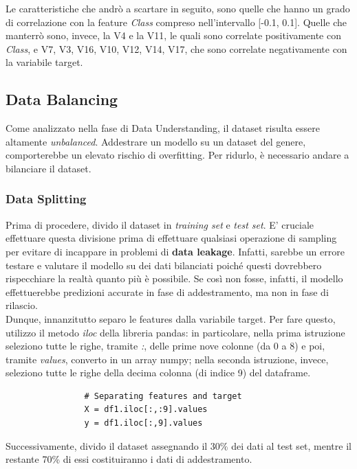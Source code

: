 \documentclass[]{article}
\begin{document}
            Le caratteristiche che andrò a scartare in seguito, sono quelle che hanno un grado di correlazione con la feature \textit{Class} compreso nell'intervallo [-0.1, 0.1]. Quelle che manterrò sono, invece, la V4 e la V11, le quali sono correlate positivamente con \textit{Class}, e V7, V3, V16, V10, V12, V14, V17, che sono correlate negativamente con la variabile target.



    \subsection{Data Balancing}
        Come analizzato nella fase di Data Understanding, il dataset risulta essere altamente \textit{unbalanced}. Addestrare un modello su un dataset del genere, comporterebbe un elevato rischio di overfitting. Per ridurlo, è necessario andare a bilanciare il dataset.
        \subsubsection{Data Splitting}
            Prima di procedere, divido il dataset in \textit{training set} e \textit{test set}. E' cruciale effettuare questa divisione prima di effettuare qualsiasi operazione di sampling per evitare di incappare in problemi di \textbf{data leakage}. Infatti, sarebbe un errore testare e valutare il modello su dei dati bilanciati poiché questi dovrebbero rispecchiare la realtà quanto più è possibile. Se così non fosse, infatti, il modello effettuerebbe predizioni accurate in fase di addestramento, ma non in fase di rilascio.\\
            Dunque, innanzitutto separo le features dalla variabile target. Per fare questo, utilizzo il metodo \textit{iloc} della libreria pandas: in particolare, nella prima istruzione seleziono tutte le righe, tramite \textit{:}, delle prime nove colonne (da 0 a 8) e poi, tramite \textit{values}, converto in un array numpy; nella seconda istruzione, invece, seleziono tutte le righe della decima colonna (di indice 9)  del dataframe.
            \begin{verbatim}
                # Separating features and target
                X = df1.iloc[:,:9].values
                y = df1.iloc[:,9].values
            \end{verbatim}
            Successivamente, divido il dataset assegnando il 30\% dei dati al test set, mentre il restante 70\% di essi costituiranno i dati di addestramento.
\end{document}
